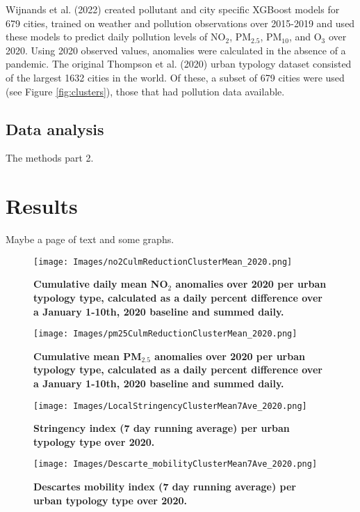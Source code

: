 \documentclass[preprint,12pt]{elsarticle}
\begin{document}
Wijnands et al. (2022) \cite{Wijnands2022} created pollutant and city specific XGBoost models for 679 cities, trained on weather and pollution observations over 2015-2019 and used these models to predict daily pollution levels of NO$_{2}$, PM$_{2.5}$, PM$_{10}$, and O$_{3}$ over 2020. Using 2020 observed values, anomalies were calculated in the absence of a pandemic. The original Thompson et al. (2020) urban typology dataset consisted of the largest 1632 cities in the world. Of these, a subset of 679 cities were used (see Figure \ref{fig:clusters}), those that had pollution data available.








\subsection{Data analysis}
The methods part 2.


\section{Results}
Maybe a page of text and some graphs.


\begin{figure}
\centering
\texttt{[image: Images/no2CulmReductionClusterMean\_2020.png]}
\caption{\bf Cumulative daily mean NO$_{2}$ anomalies over 2020 per urban typology type, calculated as a daily percent difference over a January 1-10th, 2020 baseline and summed daily. }
 \label{fig:no2}
\end{figure}

\begin{figure}
\centering
\texttt{[image: Images/pm25CulmReductionClusterMean\_2020.png]}
\caption{\bf  Cumulative mean PM$_{2.5}$ anomalies over 2020 per urban typology type, calculated as a daily percent difference over a January 1-10th, 2020 baseline and summed daily.}
 \label{fig:pm25}
\end{figure}

\begin{figure}
\centering
\texttt{[image: Images/LocalStringencyClusterMean7Ave\_2020.png]}
\caption{\bf  Stringency index (7 day running average) per urban typology type over 2020.}
 \label{fig:string}
\end{figure}

\begin{figure}
\centering
\texttt{[image: Images/Descarte\_mobilityClusterMean7Ave\_2020.png]}
\caption{\bf  Descartes mobility index (7 day running average) per urban typology type over 2020.}
 \label{fig:desc}
\end{figure}
\end{document}
